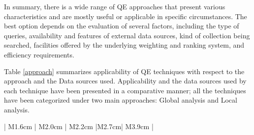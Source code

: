 In summary, there is a wide range of QE approaches that present various characteristics and are mostly useful or applicable in specific circumstances. The best option depends on the evaluation of several factors, including the type of queries, availability and features of external data sources, kind of collection being searched, facilities offered by the underlying weighting and ranking system, and efficiency requirements.


Table \ref{approach} summarizes applicability of QE techniques with respect to the approach and the Data sources used. Applicability and the data sources used by each technique have been presented in a comparative manner; all the techniques have been categorized under two main approaches: Global analysis and Local analysis. 

\begin{table}[!h]
	\centering
	\caption{Applicability of QE techniques categorized with respect to Data sources. \label{approach}}{
		
		\begin{tabular}{ | M{1.6cm} | M{2.0cm} | M{2.2cm} |M{2.7cm}| M{3.9cm} | }
			\hline 
			

\end{tabular}}
\end{table}
